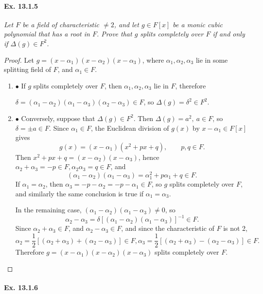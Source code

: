 \documentclass[11pt,a4paper]{article}
\newcommand{\be} {\begin{enumerate}}
\newcommand{\ee} {\end{enumerate}}
\begin{document}
\paragraph{Ex. 13.1.5}

{\it Let $F$ be a field of characteristic $\ne 2$, and let $g \in F[x]$ be a monic cubic polynomial that has a root in $F$. Prove that $g$ splits completely over $F$ if and only if $\Delta(g) \in F^2$.
}

\begin{proof}
Let $g = (x-\alpha_1)(x-\alpha_2)(x-\alpha_3)$, where $\alpha_1,\alpha_2,\alpha_3$ lie in some splitting field of $F$, and $\alpha_1 \in F$.
\be
\item[$\bullet$] If $g$ splits completely over $F$, then $\alpha_1,\alpha_2,\alpha_3$ lie in $F$, therefore 

${\delta = (\alpha_1 - \alpha_2)(\alpha_1-\alpha_3)(\alpha_2-\alpha_3) \in F}$, so
$\Delta(g)= \delta^2 \in F^2$.
\item[$\bullet$] Conversely, suppose that $\Delta(g) \in F^2$. Then $\Delta (g)= a^2, \ a \in F $, so $\delta =\pm a\in F$.
Since $\alpha_1 \in F$, the Euclidean division of $g(x)$ by $x-\alpha_1 \in F[x]$ gives 
$$g(x) = (x-\alpha_1)(x^2+px+q), \qquad p,q \in F.$$
Then $x^2+px+q = (x-\alpha_2)(x-\alpha_3)$, hence
$\alpha_2+\alpha_3 = -p \in F, \alpha_2\alpha_3 = q \in F$, and
$$(\alpha_1-\alpha_2)(\alpha_1 - \alpha_3) = \alpha_1^2  + p \alpha_1 +q \in F.$$
If $\alpha_1 = \alpha_2$, then $\alpha_3 = -p - \alpha_2 = -p - \alpha_1 \in F$, so $g$ splits completely over $F$, and similarly the same conclusion is true if $\alpha_1 = \alpha_3$. 

In the remaining case, $(\alpha_1-\alpha_2)(\alpha_1 - \alpha_3) \ne 0$, so
$$\alpha_2 - \alpha_3 = \delta [(\alpha_1-\alpha_2)(\alpha_1 - \alpha_3)]^{-1} \in F.$$
Since $\alpha_2 + \alpha_3 \in F$, and $\alpha_2 - \alpha_3 \in F$, and since the characteristic of $F$ is not 2,
$$\alpha_2 = \frac{1}{2}[(\alpha_2 + \alpha_3) +(\alpha_2-\alpha_3)] \in F, \alpha_3 = \frac{1}{2}[(\alpha_2 + \alpha_3) -(\alpha_2-\alpha_3)] \in F.$$
Therefore $g = (x-\alpha_1)(x-\alpha_2)(x-\alpha_3)$ splits completely over $F$.
\ee
\end{proof}

\paragraph{Ex. 13.1.6}
\end{document}
